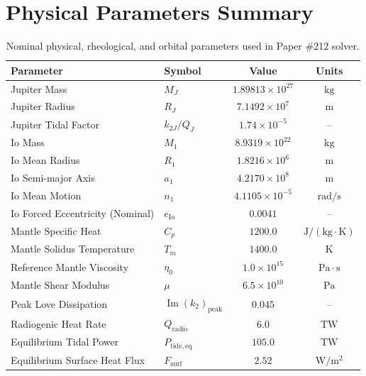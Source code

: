 \documentclass[11pt,a4paper]{article}
\begin{document}
\section{Physical Parameters Summary}
\begin{table}[H]
\centering
\caption{Nominal physical, rheological, and orbital parameters used in Paper \#212 solver.}
\vspace{2mm}
\begin{tabular}{llcc}
\toprule
\textbf{Parameter} & \textbf{Symbol} & \textbf{Value} & \textbf{Units} \\
\midrule
Jupiter Mass & $M_J$ & $1.89813 \times 10^{27}$ & $\mathrm{kg}$ \\
Jupiter Radius & $R_J$ & $7.1492 \times 10^7$ & $\mathrm{m}$ \\
Jupiter Tidal Factor & $k_{2J}/Q_J$ & $1.74 \times 10^{-5}$ & -- \\
Io Mass & $M_1$ & $8.9319 \times 10^{22}$ & $\mathrm{kg}$ \\
Io Mean Radius & $R_1$ & $1.8216 \times 10^6$ & $\mathrm{m}$ \\
Io Semi-major Axis & $a_1$ & $4.2170 \times 10^8$ & $\mathrm{m}$ \\
Io Mean Motion & $n_1$ & $4.1105 \times 10^{-5}$ & $\mathrm{rad/s}$ \\
Io Forced Eccentricity (Nominal) & $e_{\mathrm{Io}}$ & $0.0041$ & -- \\
Mantle Specific Heat & $C_p$ & $1200.0$ & $\mathrm{J/(kg\cdot K)}$ \\
Mantle Solidus Temperature & $T_m$ & $1400.0$ & $\mathrm{K}$ \\
Reference Mantle Viscosity & $\eta_0$ & $1.0 \times 10^{15}$ & $\mathrm{Pa\cdot s}$ \\
Mantle Shear Modulus & $\mu$ & $6.5 \times 10^{10}$ & $\mathrm{Pa}$ \\
Peak Love Dissipation & $\operatorname{Im}(k_2)_{\mathrm{peak}}$ & $0.045$ & -- \\
Radiogenic Heat Rate & $Q_{\mathrm{radio}}$ & $6.0$ & $\mathrm{TW}$ \\
Equilibrium Tidal Power & $P_{\mathrm{tide, eq}}$ & $105.0$ & $\mathrm{TW}$ \\
Equilibrium Surface Heat Flux & $F_{\mathrm{surf}}$ & $2.52$ & $\mathrm{W/m^2}$ \\
\bottomrule
\end{tabular}
\end{table}
\end{document}
